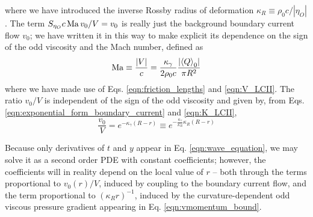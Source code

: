 \documentclass[%
 reprint,
superscriptaddress,
longbibliography,
 amsmath,amssymb,
 prl,
 citeautoscript,
]{revtex4-1}
\begin{document}
where we have introduced the inverse Rossby radius of deformation $\kappa_R \equiv \rho_0 c / | \eta_O |$. The term $S_{\eta_O} c \, {\rm Ma} \, v_0 / V = v_0$ is really just the background boundary current flow $v_0$; we have written it in this way to make explicit its dependence on the sign of the odd viscosity and the Mach number, defined as
\begin{equation}
{\rm Ma} \equiv \frac{\left| V \right|}{c} = \frac{\kappa_{\gamma}}{2 \rho_0 c} \frac{\left| \left\langle Q \right\rangle_0 \right|}{\pi R^2}
\label{eqn:Ma}
\end{equation}
where we have made use of Eqs. \ref{eqn:friction_lengths} and \ref{eqn:V_LCII}. The ratio $v_0/V$ is independent of the sign of the odd viscosity and given by, from Eqs. \ref{eqn:exponential_form_boundary_current} and \ref{eqn:K_LCII},
\begin{equation}
\frac{v_0}{V} = e^{- \kappa_{\gamma} \left( R - r \right)} \equiv e^{- \frac{\kappa_{\gamma}}{\kappa_R} \kappa_R \left( R - r \right)}
\label{eqn:v_ratio}
\end{equation}

Because only derivatives of $t$ and $y$ appear in Eq. \ref{eqn:wave_equation}, we may solve it as a second order PDE with constant coefficients; however, the coefficients will in reality depend on the local value of $r$ -- both through the terms proportional to $v_0(r)/V$, induced by coupling to the boundary current flow, and the term proportional to $\left( \kappa_R r \right)^{-1}$, induced by the curvature-dependent odd viscous pressure gradient appearing in Eq. \ref{eqn:vmomentum_bound}.
\end{document}
